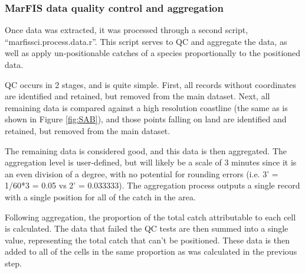 \documentclass[letterpaper,portrait,11pt]{scrartcl}
\numberwithin{equation}{section}		%
\numberwithin{figure}{section}		%
\numberwithin{table}{section}				%
\begin{document}



\subsubsection{MarFIS data quality control and aggregation}
Once data was extracted, it was processed through a second script, \textquotedblleft marfissci.process.data.r\textquotedblright.  This script serves to QC and aggregate the data, as well as apply un-positionable catches of a species proportionally to the positioned data.

QC occurs in 2 stages, and is quite simple.  First, all records without coordinates are identified and retained, but removed from the main dataset.  Next, all remaining data is compared against a high resolution coastline (the same as is shown in Figure \ref{fig:SAB}), and those points falling on land are identified and retained, but removed from the main dataset.

The remaining data is considered good, and this data is then aggregated.  The aggregation level is user-defined, but will likely be a scale of 3 minutes since it is an even division of a degree, with no potential for rounding errors (i.e. 3' = 1/60*3 = 0.05 vs 2' = 0.033333).  The aggregation process outputs a single record with a single position for all of the catch in the area.

Following aggregation, the proportion of the total catch attributable to each cell is calculated.  The data that failed the QC tests are then summed into a single value, representing the total catch that can\textquoteright t be positioned.  These data is then added to all of the cells in the same proportion as was calculated in the previous step.
\end{document}
